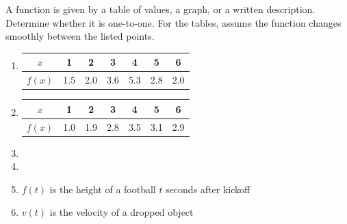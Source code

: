 \begin{Exercise}[label=invfunc1]
  A function is given by a table of values, a graph, or a written description.
  Determine whether it is one-to-one. For the tables, assume the function
  changes smoothly between the listed points.
  \begin{enumerate}
    \item
          \begin{tabular}{|c|c|c|c|c|c|c|}\hline
            $x$    & 1   & 2   & 3   & 4   & 5   & 6   \\
            \hline
            $f(x)$ & 1.5 & 2.0 & 3.6 & 5.3 & 2.8 & 2.0 \\
            \hline
          \end{tabular}
    \item
          \begin{tabular}{|c|c|c|c|c|c|c|}\hline
            $x$    & 1   & 2   & 3   & 4   & 5   & 6   \\
            \hline
            $f(x)$ & 1.0 & 1.9 & 2.8 & 3.5 & 3.1 & 2.9 \\
            \hline
          \end{tabular}
    \item
    \item
    \item $f(t)$ is the height of a football $t$ seconds after kickoff
    \item $v(t)$ is the velocity of a dropped object
  \end{enumerate}
\end{Exercise}

